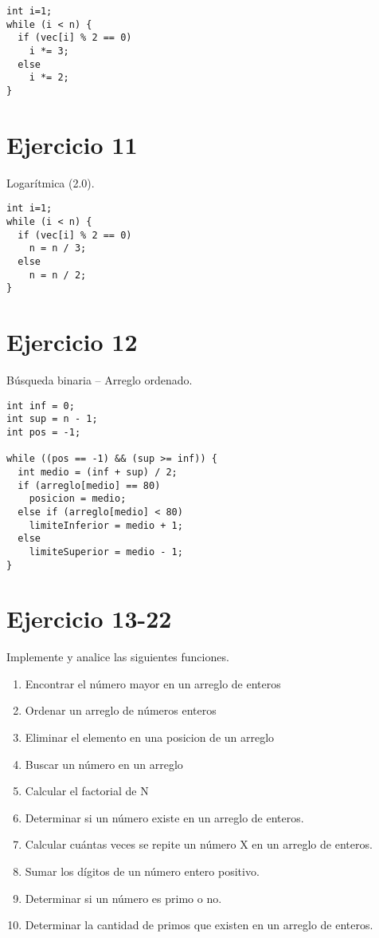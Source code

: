 \documentclass{article}
\begin{document}
\begin{lstlisting}
int i=1;
while (i < n) {
  if (vec[i] % 2 == 0)
  	i *= 3;
  else
  	i *= 2;
}
\end{lstlisting}

\section{Ejercicio 11}
Logarítmica (2.0).

\begin{lstlisting}
int i=1;
while (i < n) {
  if (vec[i] % 2 == 0)
  	n = n / 3;
  else
  	n = n / 2;
}
\end{lstlisting}

\section{Ejercicio 12}
Búsqueda binaria – Arreglo ordenado.

\begin{lstlisting}
int inf = 0;
int sup = n - 1;
int pos = -1;

while ((pos == -1) && (sup >= inf)) {
  int medio = (inf + sup) / 2;
  if (arreglo[medio] == 80)
  	posicion = medio;
  else if (arreglo[medio] < 80)
  	limiteInferior = medio + 1;
  else
  	limiteSuperior = medio - 1;
}
\end{lstlisting}

\section{Ejercicio 13-22}
Implemente y analice las siguientes funciones.
\begin{enumerate}
\item Encontrar el número mayor en un arreglo de enteros
\item Ordenar un arreglo de números enteros
\item Eliminar el elemento en una posicion de un arreglo
\item Buscar un número en un arreglo
\item Calcular el factorial de N
\item Determinar si un número existe en un arreglo de enteros.
\item Calcular cuántas veces se repite un número X en un arreglo de enteros.
\item Sumar los dígitos de un número entero positivo.
\item Determinar si un número es primo o no.
\item Determinar la cantidad de primos que existen en un arreglo de enteros.
\end{enumerate}
\end{document}
